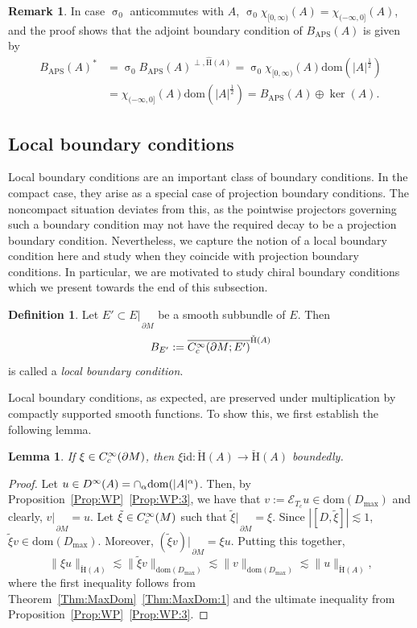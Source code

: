 \documentclass[a4paper,10pt,reqno]{amsart}
\newcommand{\sym}{\upsigma}
\newcommand{\rest}[1]{{{\lvert_{}}_{}}_{#1}}
\newcommand{\id}{\mathrm{id}}
\newcommand{\modulus}[1]{|#1|}
\newcommand{\norm}[1]{\| #1 \|}%
\newcommand{\Ck}[2][{}]{{\rm C}^{#2}_{\rm #1}}%
\newcommand{\Dk}[2][{}]{{\rm D}^{#2}_{\rm #1}}%
\newcommand{\checkH}{\check{\mathrm{H}}}
\newcommand{\hatH}{\hat{\mathrm{H}}}
\newcommand{\dom}{\mathrm{dom}}
\newcommand{\close}[1]{\overline{#1}}
\newcommand{\ext}{\mathcal{E}}
\newcommand{\APS}{\mathrm{APS}}
\newcommand{\dM}{\partial M}
\newtheorem{lemma}[theorem]{Lemma}
\theoremstyle{definition}
\newtheorem{definition}[theorem]{Definition}
\newtheorem{remark}[theorem]{Remark}
\begin{document}
\begin{remark}\label{rem:BAPS-adjoint}
In case $\sym_0$ anticommutes with $A$, $\sym_0 \chi_{[0,\infty)}(A) =  \chi_{(-\infty,0]}(A)$, and the proof shows that the adjoint boundary condition of $B_{\APS}(A)$ is given by
\begin{align*}
B_{\APS}(A)^* 
&= 
\sym_0 B_{\APS}(A)^{\perp,\hatH(A)} 
= 
\sym_0 \chi_{[0,\infty)}(A) \dom(\modulus{A}^{\frac12}) \\
&=
\chi_{(-\infty,0]}(A) \dom(\modulus{A}^{\frac12}) 
=
B_{\APS}(A) \oplus \ker(A).
\end{align*}
\end{remark}

\subsection{Local boundary conditions}

Local boundary conditions are an important class of boundary conditions. 
In the compact case, they arise as a special case of projection boundary conditions. 
The noncompact situation deviates from this, as the pointwise projectors governing such a boundary condition may not have the required decay to be a projection boundary condition.
Nevertheless, we capture the notion of a local boundary condition here and study when they coincide with projection boundary conditions. 
In particular, we are motivated to study chiral boundary conditions which we present towards the end of this subsection.


\begin{definition}
Let $E' \subset E\rest{\dM}$ be a smooth subbundle of $E$.
Then
\[
B_{E'} := \close{\Ck[c]{\infty}(\dM;E')}^{\checkH(A)}
\]
is called a \emph{local boundary condition}.
\end{definition}

Local boundary conditions, as expected, are preserved under multiplication by compactly supported smooth functions.
To show this, we first establish the following lemma.

\begin{lemma}
\label{Lem:CzechBound}
If $\xi \in \Ck[c]{\infty}(\dM)$, then $\xi \id: \checkH(A) \to \checkH(A)$ boundedly.
\end{lemma}
\begin{proof}
Let $u \in \Dk{\infty}(A) = \cap_{\alpha} \dom(\modulus{A}^{\alpha})$.
Then, by Proposition~\ref{Prop:WP}~\ref{Prop:WP:3}, we have that $v := \ext_{T_c}u \in \dom(D_{\max})$ and clearly, $v\rest{\dM} = u$.
Let $\tilde{\xi} \in \Ck[c]{\infty}(M)$ such that $\tilde{\xi}\rest{\dM} = \xi$.
Since $\modulus{[D, \tilde{\xi}]}\lesssim  1$, $\tilde{\xi}v \in \dom(D_{\max})$.
Moreover, $(\tilde{\xi}v)\rest{\dM} = \xi u$.
Putting this together,
$$ \norm{\xi u}_{\checkH(A)} \lesssim \norm{\tilde{\xi}v}_{\dom(D_{\max})} \lesssim \norm{v}_{\dom(D_{\max})} \lesssim \norm{u}_{\checkH(A)},$$
where the first inequality follows from Theorem~\ref{Thm:MaxDom}~\ref{Thm:MaxDom:1} and the ultimate inequality  from Proposition~\ref{Prop:WP}~\ref{Prop:WP:3}.
\end{proof}
\end{document}
